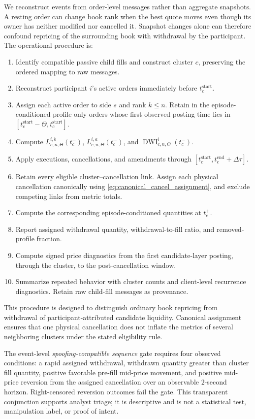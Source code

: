 \documentclass[11pt]{article}
\begin{document}
We reconstruct events from order-level messages rather than aggregate snapshots. A resting order can change book rank
when the best quote moves even though its owner has neither modified nor cancelled it. Snapshot changes alone can therefore
confound repricing of the surrounding book with withdrawal by the participant. The operational procedure is:
\begin{enumerate}
    \item Identify compatible passive child fills and construct cluster $c$, preserving the ordered mapping to raw messages.
    \item Reconstruct participant $i$'s active orders immediately before $t_c^{\mathrm{start}}$.
    \item Assign each active order to side $s$ and rank $k\leq n$. Retain in the episode-conditioned profile
    only orders whose first observed posting time lies in
    $[t_c^{\mathrm{start}}-\Theta,t_c^{\mathrm{start}}]$.
    \item Compute $L^{i,b}_{c,n,\Theta}(t_c^{-})$, $L^{i,a}_{c,n,\Theta}(t_c^{-})$, and
    $\operatorname{DWI}^{i}_{c,n,\Theta}(t_c^{-})$.
    \item Apply executions, cancellations, and amendments through
    $[t_c^{\mathrm{start}},t_c^{\mathrm{end}}+\Delta\tau]$.
    \item Retain every eligible cluster--cancellation link. Assign each physical cancellation canonically using
    \cref{eq:canonical_cancel_assignment}, and exclude competing links from metric totals.
    \item Compute the corresponding episode-conditioned quantities at $t_c^{+}$.
    \item Report assigned withdrawal quantity, withdrawal-to-fill ratio, and removed-profile fraction.
    \item Compute signed price diagnostics from the first candidate-layer posting, through the cluster, to the
    post-cancellation window.
    \item Summarize repeated behavior with cluster counts and client-level recurrence diagnostics. Retain raw child-fill
    messages as provenance.
\end{enumerate}
This procedure is designed to distinguish ordinary book repricing from withdrawal of participant-attributed candidate
liquidity. Canonical assignment ensures that one physical cancellation does not inflate the metrics of several neighboring
clusters under the stated eligibility rule.

The event-level \textit{spoofing-compatible sequence} gate requires four observed conditions: a rapid assigned
withdrawal, withdrawn quantity greater than cluster fill quantity, positive favorable pre-fill mid-price movement, and
positive mid-price reversion from the assigned cancellation over an observable $2$-second horizon. Right-censored
reversion outcomes fail the gate. This transparent conjunction supports analyst triage; it is descriptive and is not a
statistical test, manipulation label, or proof of intent.
\end{document}
